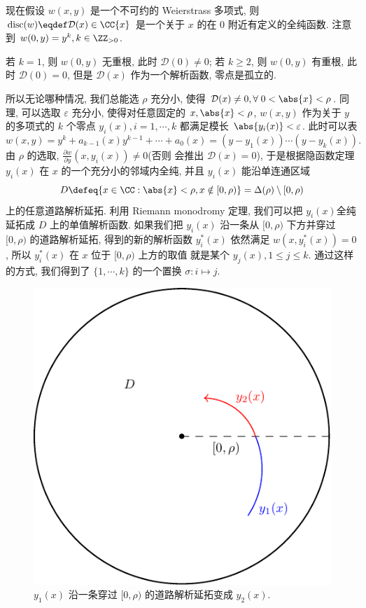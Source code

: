 现在假设 $w(x,y)$ 是一个不可约的 Weierstrass 多项式,
则 $\mathrm{disc}(w) \eqdef \mathcal{D}(x) \in \CC\{x\}$
是一个关于 $x$ 的在 $0$ 附近有定义的全纯函数.
注意到 $w(0,y) = y^k, k \in \ZZ_{>0}$.
\begin{itemize}
    \ii 若 $k = 1$, 则 $w(0,y)$ 无重根, 此时 $\mathcal{D}(0) \ne 0$;
    \ii 若 $k \ge 2$, 则 $w(0,y)$ 有重根, 此时 $\mathcal{D}(0) = 0$,
    但是 $\mathcal{D}(x)$ 作为一个解析函数, 零点是孤立的.
\end{itemize}
所以无论哪种情况, 我们总能选 $\rho$ 充分小,
使得 $\mathcal{D}(x) \ne 0, \forall\;0 < \abs{x} < \rho$.
同理, 可以选取 $\varepsilon$ 充分小,
使得对任意固定的 $x, \abs{x} < \rho$,
$w(x,y)$ 作为关于 $y$ 的多项式的 $k$ 个零点
$y_i(x), i = 1,\cdots, k$ 都满足模长 $\abs{y_i(x)} < \varepsilon$.
此时可以表
\[w(x,y) = y^k + a_{k-1}(x)y^{k-1} + \cdots + a_0(x) = (y-y_1(x))\cdots (y-y_k(x)).\]
由 $\rho$ 的选取, $\frac{\partial w}{\partial y}(x,y_i(x)) \ne 0$(否则
会推出 $\mathcal{D}(x) = 0$), 于是根据隐函数定理
$y_i(x)$ 在 $x$ 的一个充分小的邻域内全纯,
并且 $y_i(x)$ 能沿单连通区域
\[D \defeq \{x \in \CC: \abs{x} < \rho, x \notin [0,\rho)\} = \Delta(\rho)\setminus [0,\rho)\]
上的任意道路解析延拓.
利用 Riemann monodromy 定理,
我们可以把 $y_i(x)$全纯延拓成 $D$ 上的单值解析函数.
如果我们把 $y_i(x)$ 沿一条从 $[0,\rho)$ 下方并穿过
$[0,\rho)$ 的道路解析延拓,
得到的新的解析函数 $y_i^*(x)$ 依然满足 $w(x,y_i^*(x)) = 0$,
所以 $y_i^*(x)$ 在 $x$ 位于 $[0,\rho)$ 上方的取值
就是某个 $y_j(x), 1 \le j \le k$.
通过这样的方式, 我们得到了 $\{1,\cdots,k\}$ 的一个置换 $\sigma: i \mapsto j$.

\begin{figure}[H]
    \centering
    \includegraphics[scale = 0.8]{fig-05.pdf}
    \caption{$y_1(x)$ 沿一条穿过 $[0,\rho)$ 的道路解析延拓变成 $y_2(x)$.}
    \label{fig:analytic-continuation}
\end{figure}

